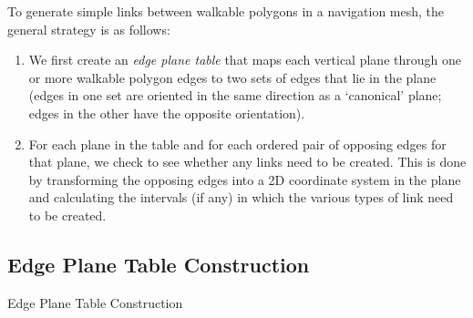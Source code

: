 \documentclass[10pt,twocolumn]{article}
\begin{document}
To generate simple links between walkable polygons in a navigation mesh, the general strategy is as follows:
%
\begin{enumerate}
\item We first create an \emph{edge plane table} that maps each vertical plane through one or more walkable polygon edges to two sets of edges that lie in the plane (edges in one set are oriented in the same direction as a `canonical' plane; edges in the other have the opposite orientation).
\item For each plane in the table and for each ordered pair of opposing edges for that plane, we check to see whether any links need to be created. This is done by transforming the opposing edges into a 2D coordinate system in the plane and calculating the intervals (if any) in which the various types of link need to be created.
\end{enumerate}

\subsection{Edge Plane Table Construction}

\begin{stulisting}[t]
\caption{Edge Plane Table Construction}
\label{code:ept-construction}

\end{stulisting}
\end{document}
